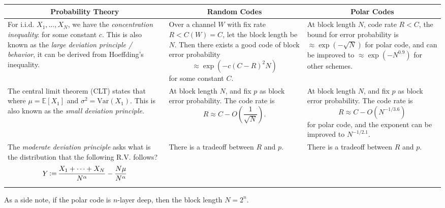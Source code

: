 \begin{table}[H]
    \centering
    \begin{tabularx}{\textwidth}{X|X|X}
        \multicolumn{1}{c}{Probability Theory} & \multicolumn{1}{c}{Random Codes} & \multicolumn{1}{c}{Polar Codes} \\ \hline\hline
        For i.i.d. $X_1,\ldots,X_N$, we have the \textit{concentration inequality}:
        \resizebox{\linewidth}{!}{
        $\begin{aligned}
            \mathrm{Pr}\left\{\frac{X_1+\cdots+X_N}{N} -\mathbb{E}[X_1] \ge t\right\} \\ \le \exp(-ct^2N)
        \end{aligned}$
        }
        for some constant $c$. This is also known as the \textit{large deviation principle / behavior}, it can be derived from Hoeffding's inequality. &
        Over a channel $W$ with fix rate $R<C(W)=C$, let the block length be $N$. Then there exists a good code of block error probability
        \begin{equation*}
            \approx \exp(-c(C-R)^2N)
        \end{equation*}
        for some constant $C$. &
        At block length $N$, code rate $R<C$, the bound for error probability is $\approx\exp(-\sqrt{N})$ for polar code, and can be improved to $\approx\exp(-N^{0.9})$ for other schemes.\\ \hline
        The central limit theorem (CLT) states that
        \resizebox{\linewidth}{!}{
        $\begin{aligned}
            Z \defeq \frac{X_1+\cdots+X_N}{\sqrt{N}} - \sqrt{N}\mu \\ \sim \mathcal{N}(0,\sigma^2),
        \end{aligned}$
        }
        where $\mu=\mathbb{E}[X_1]$ and $\sigma^2=\mathrm{Var}(X_1)$. This is also known as the \textit{small deviation principle}. & 
        At block length $N$, and fix $p$ as block error probability. The code rate is
        \begin{equation*}
            R \approx C- O\left(\frac{1}{\sqrt{N}}\right).
        \end{equation*} &
        At block length $N$, and fix $p$ as block error probability. The code rate is
        \begin{equation*}
            R\approx C-O(N^{-1/3.6})
        \end{equation*}
        for polar code, and the exponent can be improved to $N^{-1/2.1}$. \\ \hline
        The \textit{moderate deviation principle} asks what is the distribution that the following R.V. follows?
        \begin{equation*}
            Y \operatorname{\vcentcolon=} \frac{X_1+\cdots+X_N}{N^\alpha}-\frac{N\mu}{N^\alpha}
        \end{equation*} &
        There is a tradeoff between $R$ and $p$. &
        There is a tradeoff between $R$ and $p$.
    \end{tabularx}
\end{table}
As a side note, if the polar code is $n$-layer deep, then the block length $N=2^n$.

